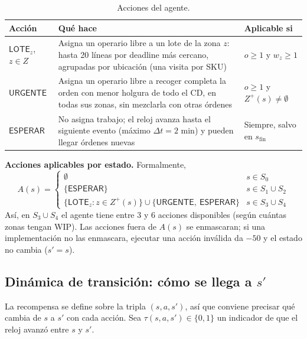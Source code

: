 \documentclass[11pt,letterpaper]{article}
\newcommand{\LOTE}[1]{\mathsf{LOTE}_{#1}}
\newcommand{\URG}{\mathsf{URGENTE}}
\newcommand{\ESP}{\mathsf{ESPERAR}}
\newcommand{\sfin}{s_{\mathrm{fin}}}
\begin{document}
\begin{table}[h]
\centering\small
\begin{tabularx}{\textwidth}{@{}p{2.4cm}Lp{4.2cm}@{}}
\toprule
\textbf{Acción} & \textbf{Qué hace} & \textbf{Aplicable si} \\
\midrule
$\LOTE{z}$, $z\in Z$ & Asigna un operario libre a un lote de la zona $z$: hasta 20 líneas por deadline más cercano, agrupadas por ubicación (una visita por SKU) & $o\ge 1$ y $w_z \ge 1$ \\
$\URG$ & Asigna un operario libre a recoger completa la orden con menor holgura de todo el CD, en todas sus zonas, sin mezclarla con otras órdenes & $o\ge1$ y $Z^{+}(s)\neq\emptyset$ \\
$\ESP$ & No asigna trabajo; el reloj avanza hasta el siguiente evento (máximo $\Delta t = 2$ min) y pueden llegar órdenes nuevas & Siempre, salvo en $\sfin$ \\
\bottomrule
\end{tabularx}
\caption{Acciones del agente.}
\end{table}

\textbf{Acciones aplicables por estado.} Formalmente,
\[
A(s) =
\begin{cases}
  \emptyset & s \in S_0 \\[2pt]
  \{\ESP\} & s \in S_1 \cup S_2 \\[2pt]
  \{\LOTE{z} : z \in Z^{+}(s)\} \cup \{\URG,\ \ESP\} & s \in S_3 \cup S_4
\end{cases}
\]
Así, en $S_3 \cup S_4$ el agente tiene entre 3 y 6 acciones disponibles (según cuántas zonas
tengan WIP). Las acciones fuera de $A(s)$ se enmascaran; si una implementación no las enmascara,
ejecutar una acción inválida da $-50$ y el estado no cambia ($s'=s$).

\subsection{Dinámica de transición: cómo se llega a \texorpdfstring{$s'$}{s'}}

La recompensa se define sobre la tripla $(s,a,s')$, así que conviene precisar qué cambia de $s$
a $s'$ con cada acción. Sea $\tau(s,a,s') \in \{0,1\}$ un indicador de que el reloj avanzó
entre $s$ y $s'$.
\end{document}
